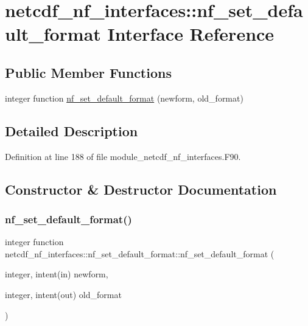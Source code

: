 \hypertarget{interfacenetcdf__nf__interfaces_1_1nf__set__default__format}{}\section{netcdf\+\_\+nf\+\_\+interfaces\+:\+:nf\+\_\+set\+\_\+default\+\_\+format Interface Reference}
\label{interfacenetcdf__nf__interfaces_1_1nf__set__default__format}
\subsection*{Public Member Functions}
\begin{DoxyCompactItemize}
\item 
integer function \hyperlink{interfacenetcdf__nf__interfaces_1_1nf__set__default__format_af6d6c9a75f504046e395c8c4c311a312}{nf\+\_\+set\+\_\+default\+\_\+format} (newform, old\+\_\+format)
\end{DoxyCompactItemize}


\subsection{Detailed Description}


Definition at line 188 of file module\+\_\+netcdf\+\_\+nf\+\_\+interfaces.\+F90.



\subsection{Constructor \& Destructor Documentation}
\mbox{\label{interfacenetcdf__nf__interfaces_1_1nf__set__default__format_af6d6c9a75f504046e395c8c4c311a312}} 
\subsubsection{\texorpdfstring{nf\+\_\+set\+\_\+default\+\_\+format()}{nf\_set\_default\_format()}}
{\footnotesize\ttfamily integer function netcdf\+\_\+nf\+\_\+interfaces\+::nf\+\_\+set\+\_\+default\+\_\+format\+::nf\+\_\+set\+\_\+default\+\_\+format (\begin{DoxyParamCaption}\item[{integer, intent(in)}]{newform,  }\item[{integer, intent(out)}]{old\+\_\+format }\end{DoxyParamCaption})}



